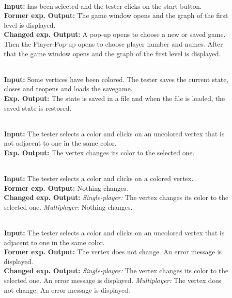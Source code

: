 
\begin{description}
	\item[] \textbf{} \\
	\textbf{Input:} \graphcoloring has been selected and the tester clicks on the start button. \\
	\textbf{Former exp. Output:} The game window opens and the graph of the first level is displayed. \\
	\textbf{Changed exp. Output:} A pop-up opens to choose a new or saved game. Then the Player-Pop-up opens to choose player number and names. After that the game window opens and the graph of the first level is displayed.
	
	\item[] \textbf{} \\
	\textbf{Input:} Some vertices have been colored. The tester saves the current state, closes and reopens \graphcoloring and loads the savegame. \\
	\textbf{Exp. Output:} The state is saved in a file and when the file is loaded, the saved state is restored.
	
	\item[] \textbf{} \\
	\textbf{Input:} The tester selects a color and clicks on an uncolored vertex that is not adjacent to one in the same color. \\
	\textbf{Exp. Output:} The vertex changes its color to the selected one.
	
	\item[] \textbf{} \\
	\textbf{Input:} The tester selects a color and clicks on a colored vertex. \\
	\textbf{Former exp. Output:} Nothing changes. \\
	\textbf{Changed exp. Output:} \emph{Single-player:} The vertex changes its color to the selected one. \emph{Multiplayer:} Nothing changes.
	
	\item[] \textbf{} \\
	\textbf{Input:} The tester selects a color and clicks on an uncolored vertex that is adjacent to one in the same color. \\
	\textbf{Former exp. Output:} The vertex does not change. An error message is displayed. \\
	\textbf{Changed exp. Output:} \emph{Single-player:} The vertex changes its color to the selected one. An error message is displayed. \emph{Multiplayer:} The vertex does not change. An error message is displayed.
	

\end{description}
